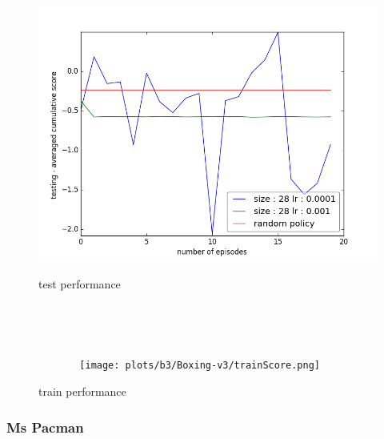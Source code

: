 \documentclass{report}
\begin{document}
\begin{figure}[H]
\begin{minipage}[c]{.49\linewidth}
	\centering
	\includegraphics[width = \linewidth]{plots/b3/Boxing-v3/testScoreMean.png}
	\caption{test performance}
    \end{minipage}
    \hfill%
\begin{minipage}[c]{.49\linewidth}
    \centering 
    \texttt{[image: plots/b3/Boxing-v3/trainScore.png]}
	\caption{train performance}
\end{minipage}
\end{figure}

\subsubsection*{Ms Pacman}
\end{document}
